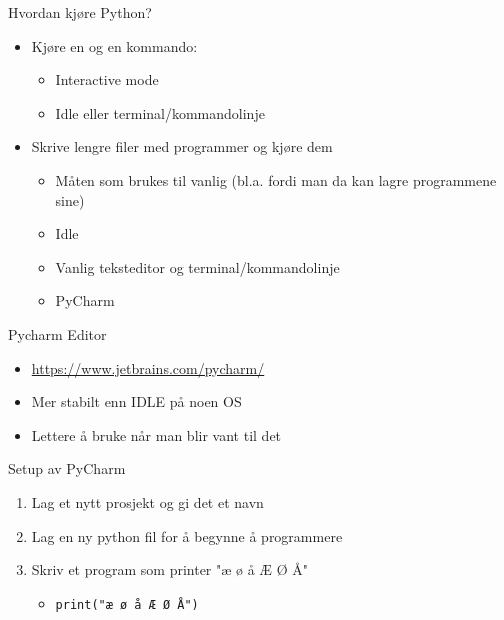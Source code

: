 \documentclass[screen, aspectratio=169]{beamer}
\begin{document}
\begin{frame}{Hvordan kjøre Python?}
\begin{itemize}
	\item Kjøre en og en kommando:
	\begin{itemize}
		\item Interactive mode
		\item Idle eller terminal/kommandolinje
	\end{itemize}
	\item Skrive lengre filer med programmer og kjøre dem
	\begin{itemize}
		\item Måten som brukes til vanlig (bl.a. fordi man da kan lagre programmene sine)
		\item Idle
		\item Vanlig teksteditor og terminal/kommandolinje
		\item PyCharm
	\end{itemize}
\end{itemize}
\end{frame}

\begin{frame}{Pycharm Editor}
	\begin{itemize}
		\item \href{https://www.jetbrains.com/pycharm/}{https://www.jetbrains.com/pycharm/}
		\item Mer stabilt enn IDLE på noen OS
		\item Lettere å bruke når man blir vant til det
	\end{itemize}
\end{frame}

\begin{frame}[fragile]{Setup av PyCharm}
	\begin{enumerate}
		\item Lag et nytt prosjekt og gi det et navn
		\item Lag en ny python fil for å begynne å programmere
		\item Skriv et program som printer "æ ø å Æ Ø Å"
		\begin{itemize}
			\item \lstinline|print("æ ø å Æ Ø Å")|
		\end{itemize}
	\end{enumerate}
\end{frame}
\end{document}
